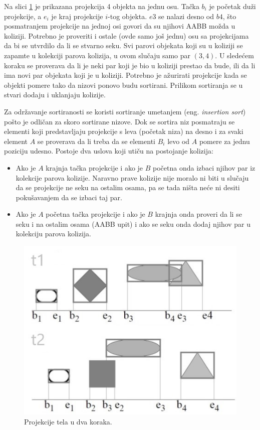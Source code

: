 \documentclass[12pt,oneside]{memoir}
\begin{document}
Na slici \ref{fig:sap} je prikazana projekcija 4 objekta na jednu osu. 
Tačka $b_i$ je početak duži projekcije, a $e_i$ je kraj projekcije $i$-tog objekta.
$e3$ se nalazi desno od $b4$, što posmatranjem projekcije na jednoj osi govori da su njihovi AABB možda u koliziji.
Potrebno je proveriti i ostale (ovde samo još jednu) osu sa projekcijama da bi se utvrdilo da li se stvarno seku.
Svi parovi objekata koji su u koliziji se zapamte u kolekciji parova kolizija, u ovom slučaju samo par $(3, 4)$.
U sledećem koraku se proverava da li je neki par koji je bio u koliziji prestao da bude, ili da li ima novi par objekata koji je u koliziji.
Potrebno je ažurirati projekcije kada se objekti pomere tako da nizovi ponovo budu sortirani. Prilikom sortiranja se u stvari dodaju i uklanjaju kolizije.

Za održavanje sortiranosti se koristi sortiranje umetanjem (eng. {\em insertion sort}) pošto je odličan za skoro sortirane nizove.
Dok se sortira niz posmatraju se elementi koji predstavljaju projekcije s leva (početak niza) na desno i za svaki element $A$ se proverava da li treba da se elementi $B_i$ levo od $A$
pomere za jednu poziciju udesno. Postoje dva uslova koji utiču na postojanje kolizija:
\begin{itemize}  
	\item Ako je $A$ krajnja tačka projekcije i ako je $B$ početna onda izbaci njihov par iz kolekcije parova kolizije.
	Naravno prave kolizije nije moralo ni biti u slučaju da se projekcije ne seku na ostalim osama, 
	pa se tada ništa neće ni desiti pokušavanjem da se izbaci taj par.
	\item Ako je $A$ početna tačka projekcije i ako je $B$ krajnja onda proveri da li se seku i na ostalim osama (AABB upit) i ako se seku onda
	dodaj njihov par u kolekciju parova kolizija.

\end{itemize}  


\begin{figure}[h!]
	\begin{center}
	\includegraphics[scale=1]{sap.jpg}
	\end{center}
	\caption{Projekcije tela u dva koraka.}
	\label{fig:sap}
\end{figure}
\end{document}
